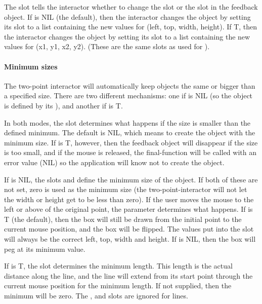 The slot  tells the interactor whether to change the 
slot or the  slot in the feedback object.
If  is NIL (the default), then the interactor changes the
object by setting its
 slot to a list containing the new values for (left, top, width,
height).  If T, then the interactor changes the object by setting its
 slot to a list containing the new values for (x1, y1, x2, y2).
(These are the same slots as used for ).


\paragraph{Minimum sizes}
\label{Minimumsizes}
The two-point interactor will automatically keep objects the same or bigger than a
specified size.  There are two different mechanisms: one if  is
NIL (so the object is defined by its ), and another if
 is T.

In both modes, the slot  determines what happens if
the size is smaller than the defined minimum.  The default is NIL, which
means to create the object with the minimum size.  If
 is T, however, then the feedback object will
disappear if the size is too small, and if the mouse is released, the
final-function will be called with an error value (NIL) so the application will
know not to create the object.

If  is NIL, the slots  and 
define the minimum size of the object.  If both of these are not set, zero is used
as the minimum size (the two-point-interactor will not let the width or
height get to be less than zero).  If the user moves the mouse to the left
or above of the original point, the parameter 
determines what happens.  If  is T (the default),
then the box will still be drawn from the initial point to the current
mouse position, and the box will be flipped.  The values put into the
 slot will always be the correct left, top, width and height.
If  is NIL, then the box will peg at its minimum
value.

If  is T, the slot  determines the minimum
length.  This length is the actual distance along the line, and the line
will extend from its start point through the current mouse position for the
minimum length.  If not
supplied, then the minimum will be zero. The ,
 and  slots are ignored for lines.

